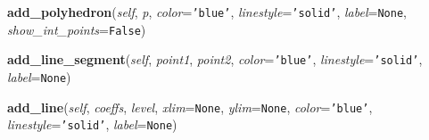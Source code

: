     \vspace{0.5ex}

\hspace{.8\funcindent}\begin{boxedminipage}{\funcwidth}

    \raggedright \textbf{add\_polyhedron}(\textit{self}, \textit{p}, \textit{color}={\tt \texttt{'}\texttt{blue}\texttt{'}}, \textit{linestyle}={\tt \texttt{'}\texttt{solid}\texttt{'}}, \textit{label}={\tt None}, \textit{show\_int\_points}={\tt False})

\setlength{\parskip}{2ex}
\setlength{\parskip}{1ex}
    \end{boxedminipage}

    \label{coinor:grumpy:polyhedron2D:Figure:add_line_segment}

    \vspace{0.5ex}

\hspace{.8\funcindent}\begin{boxedminipage}{\funcwidth}

    \raggedright \textbf{add\_line\_segment}(\textit{self}, \textit{point1}, \textit{point2}, \textit{color}={\tt \texttt{'}\texttt{blue}\texttt{'}}, \textit{linestyle}={\tt \texttt{'}\texttt{solid}\texttt{'}}, \textit{label}={\tt None})

\setlength{\parskip}{2ex}
\setlength{\parskip}{1ex}
    \end{boxedminipage}

    \label{coinor:grumpy:polyhedron2D:Figure:add_line}

    \vspace{0.5ex}

\hspace{.8\funcindent}\begin{boxedminipage}{\funcwidth}

    \raggedright \textbf{add\_line}(\textit{self}, \textit{coeffs}, \textit{level}, \textit{xlim}={\tt None}, \textit{ylim}={\tt None}, \textit{color}={\tt \texttt{'}\texttt{blue}\texttt{'}}, \textit{linestyle}={\tt \texttt{'}\texttt{solid}\texttt{'}}, \textit{label}={\tt None})

\setlength{\parskip}{2ex}
\setlength{\parskip}{1ex}
    \end{boxedminipage}

